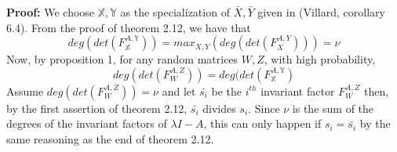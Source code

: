 \documentclass[12pt]{article}
\begin{document}
\noindent\textbf{Proof:} 
We choose $\mathbb{X},\mathbb{Y}$ as the specialization of $\bar{X},\bar{Y}$ given in (Villard, corollary 6.4). From the proof of theorem 2.12, we have that
$$ deg(det(F_{\mathbb{X}}^{A,\mathbb{Y}})) = max_{X,Y}(deg(det(F_X^{A,Y}))) = \nu $$
Now, by proposition 1, for any random matrices $W,Z$, with high probability,
$$ deg(det(F_W^{A,Z})) = deg(det(F_{\mathbb{X}}^{A,\mathbb{Y}})$$
Assume $deg(det(F_W^{A,Z})) = \nu$ and 
let $\bar{s_i}$ be the $i^{th}$ invariant factor $F_W^{A,Z}$ then, by the first assertion of theorem 2.12, $\bar{s_i}$ divides $s_i$. Since
$\nu$ is the sum of the degrees of the invariant factors of $\lambda I - A$, this can only happen if $s_i = \bar{s_i}$ by the same reasoning as the end of theorem 2.12.
\end{document}
